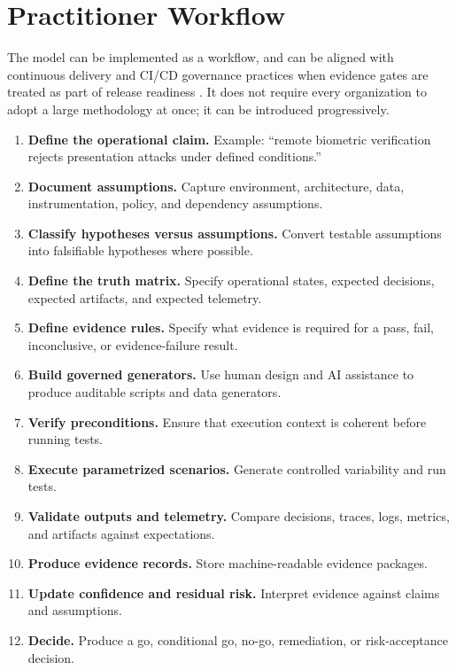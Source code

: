 \documentclass[11pt,a4paper]{article}
\begin{document}
\section{Practitioner Workflow}

The model can be implemented as a workflow, and can be aligned with continuous delivery and CI/CD governance practices when evidence gates are treated as part of release readiness \cite{humble}. It does not require every organization to adopt a large methodology at once; it can be introduced progressively.

\begin{enumerate}
\item \textbf{Define the operational claim.} Example: ``remote biometric verification rejects presentation attacks under defined conditions.''
\item \textbf{Document assumptions.} Capture environment, architecture, data, instrumentation, policy, and dependency assumptions.
\item \textbf{Classify hypotheses versus assumptions.} Convert testable assumptions into falsifiable hypotheses where possible.
\item \textbf{Define the truth matrix.} Specify operational states, expected decisions, expected artifacts, and expected telemetry.
\item \textbf{Define evidence rules.} Specify what evidence is required for a pass, fail, inconclusive, or evidence-failure result.
\item \textbf{Build governed generators.} Use human design and AI assistance to produce auditable scripts and data generators.
\item \textbf{Verify preconditions.} Ensure that execution context is coherent before running tests.
\item \textbf{Execute parametrized scenarios.} Generate controlled variability and run tests.
\item \textbf{Validate outputs and telemetry.} Compare decisions, traces, logs, metrics, and artifacts against expectations.
\item \textbf{Produce evidence records.} Store machine-readable evidence packages.
\item \textbf{Update confidence and residual risk.} Interpret evidence against claims and assumptions.
\item \textbf{Decide.} Produce a go, conditional go, no-go, remediation, or risk-acceptance decision.
\end{enumerate}
\end{document}
